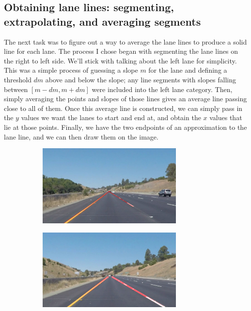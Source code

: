 \documentclass{article}
\begin{document}
\subsection{Obtaining lane lines: segmenting, extrapolating, and averaging segments}

The next task was to figure out a way to average the lane lines to produce a solid line for each lane. The process I chose began with segmenting the lane lines on the right to left side. We'll stick with talking about the left lane for simplicity. This was a simple process of guessing a slope $m$ for the lane and defining a threshold $d\!m$ above and below the slope; any line segments with slopes falling between $[m-d\!m, m+d\!m]$ were included into the left lane category. Then, simply averaging the points and slopes of those lines gives an average line passing close to all of them. Once this average line is constructed, we can simply pass in the $y$ values we want the lanes to start and end at, and obtain the $x$ values that lie at those points. Finally, we have the two endpoints of an approximation to the lane line, and we can then draw them on the image. 

\begin{figure}[htb!]
    \centering
    \caption{Hough Lines to Lane Annotations}
    
    \begin{subfigure}{0.5\textwidth}
    \centering
    \includegraphics[width=0.8\textwidth]{houghimage}
    \end{subfigure}%
    \begin{subfigure}{0.5\textwidth}
    \centering
    \includegraphics[width=0.8\textwidth]{laneimage}
    \end{subfigure}
\end{figure}
\end{document}
